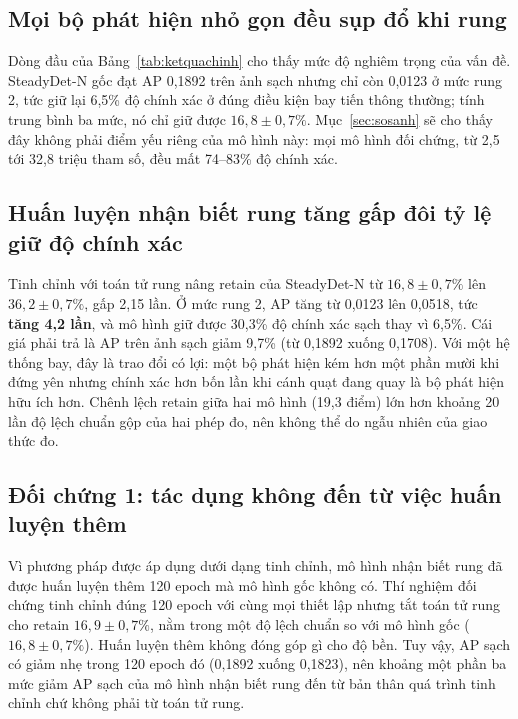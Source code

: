 \subsection{Mọi bộ phát hiện nhỏ gọn đều sụp đổ khi rung}

Dòng đầu của Bảng~\ref{tab:ketquachinh} cho thấy mức độ nghiêm trọng của vấn đề. SteadyDet-N gốc đạt AP 0,1892 trên ảnh sạch nhưng chỉ còn 0,0123 ở mức rung 2, tức giữ lại 6,5\% độ chính xác ở đúng điều kiện bay tiến thông thường; tính trung bình ba mức, nó chỉ giữ được $16{,}8 \pm 0{,}7\%$. Mục~\ref{sec:sosanh} sẽ cho thấy đây không phải điểm yếu riêng của mô hình này: mọi mô hình đối chứng, từ 2,5 tới 32,8 triệu tham số, đều mất 74--83\% độ chính xác.

\subsection{Huấn luyện nhận biết rung tăng gấp đôi tỷ lệ giữ độ chính xác}

Tinh chỉnh với toán tử rung nâng retain của SteadyDet-N từ $16{,}8 \pm 0{,}7\%$ lên $36{,}2 \pm 0{,}7\%$, gấp 2,15 lần. Ở mức rung 2, AP tăng từ 0,0123 lên 0,0518, tức \textbf{tăng 4,2 lần}, và mô hình giữ được 30,3\% độ chính xác sạch thay vì 6,5\%. Cái giá phải trả là AP trên ảnh sạch giảm 9,7\% (từ 0,1892 xuống 0,1708). Với một hệ thống bay, đây là trao đổi có lợi: một bộ phát hiện kém hơn một phần mười khi đứng yên nhưng chính xác hơn bốn lần khi cánh quạt đang quay là bộ phát hiện hữu ích hơn. Chênh lệch retain giữa hai mô hình (19,3 điểm) lớn hơn khoảng 20 lần độ lệch chuẩn gộp của hai phép đo, nên không thể do ngẫu nhiên của giao thức đo.

\subsection{Đối chứng 1: tác dụng không đến từ việc huấn luyện thêm}

Vì phương pháp được áp dụng dưới dạng tinh chỉnh, mô hình nhận biết rung đã được huấn luyện thêm 120 epoch mà mô hình gốc không có. Thí nghiệm đối chứng tinh chỉnh đúng 120 epoch với cùng mọi thiết lập nhưng tắt toán tử rung cho retain $16{,}9 \pm 0{,}7\%$, nằm trong một độ lệch chuẩn so với mô hình gốc ($16{,}8 \pm 0{,}7\%$). Huấn luyện thêm không đóng góp gì cho độ bền. Tuy vậy, AP sạch có giảm nhẹ trong 120 epoch đó (0,1892 xuống 0,1823), nên khoảng một phần ba mức giảm AP sạch của mô hình nhận biết rung đến từ bản thân quá trình tinh chỉnh chứ không phải từ toán tử rung.

